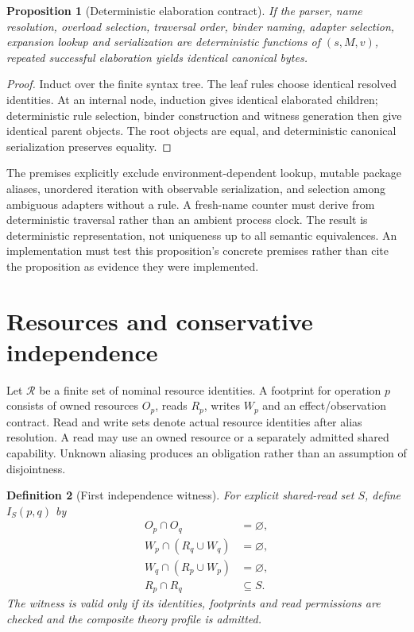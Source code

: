 \documentclass[11pt]{article}
\newtheorem{definition}{Definition}[section]
\newtheorem{proposition}[definition]{Proposition}
\theoremstyle{remark}
\begin{document}
\begin{proposition}[Deterministic elaboration contract]
If the parser, name resolution, overload selection, traversal order,
binder naming, adapter selection, expansion lookup and serialization are
deterministic functions of $(s,M,v)$, repeated successful elaboration yields
identical canonical bytes.
\end{proposition}
\begin{proof}
Induct over the finite syntax tree. The leaf rules choose identical resolved
identities. At an internal node, induction gives identical elaborated
children; deterministic rule selection, binder construction and witness
generation then give identical parent objects. The root objects are equal,
and deterministic canonical serialization preserves equality.
\end{proof}

The premises explicitly exclude environment-dependent lookup, mutable package
aliases, unordered iteration with observable serialization, and selection
among ambiguous adapters without a rule. A fresh-name counter must derive
from deterministic traversal rather than an ambient process clock. The
result is deterministic representation, not uniqueness up to all semantic
equivalences. An implementation must test this proposition's concrete
premises rather than cite the proposition as evidence they were implemented.

\section{Resources and conservative independence}
\label{sec:resources}

Let $\mathcal R$ be a finite set of nominal resource identities. A footprint
for operation $p$ consists of owned resources $O_p$, reads $R_p$, writes
$W_p$ and an effect/observation contract. Read and write sets denote actual
resource identities after alias resolution. A read may use an owned resource
or a separately admitted shared capability. Unknown aliasing produces an
obligation rather than an assumption of disjointness.

\begin{definition}[First independence witness]
For explicit shared-read set $S$, define $I_S(p,q)$ by
\begin{align*}
 O_p\cap O_q&=\varnothing,\\
 W_p\cap(R_q\cup W_q)&=\varnothing,\\
 W_q\cap(R_p\cup W_p)&=\varnothing,\\
 R_p\cap R_q&\subseteq S.
\end{align*}
The witness is valid only if its identities, footprints and read permissions
are checked and the composite theory profile is admitted.
\end{definition}
\end{document}

